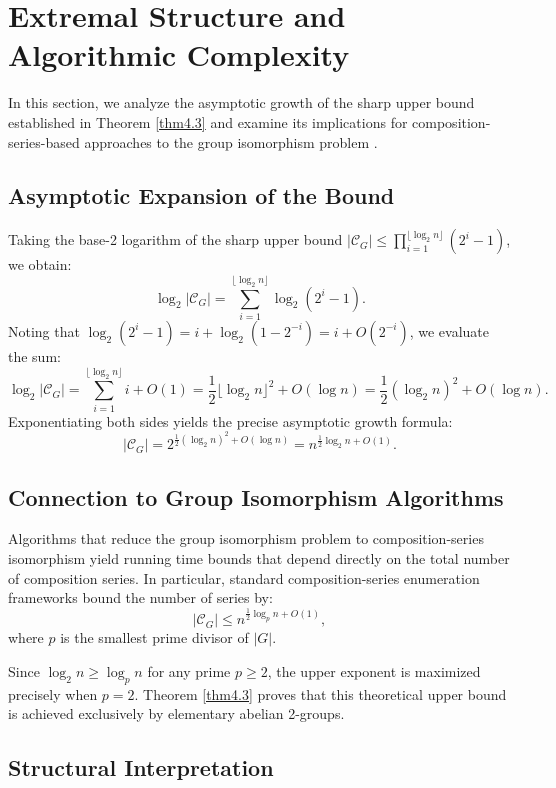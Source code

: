 \documentclass[11pt,a4paper]{article}
\theoremstyle{definition}
\begin{document}
\section{Extremal Structure and Algorithmic Complexity}

In this section, we analyze the asymptotic growth of the sharp upper bound established in Theorem \ref{thm4.3} and examine its implications for composition-series-based approaches to the group isomorphism problem \cite{rosenbaum}.

\subsection{Asymptotic Expansion of the Bound}

Taking the base-2 logarithm of the sharp upper bound $|\mathcal{C}_G| \le \prod_{i=1}^{\lfloor \log_2 n \rfloor} (2^i - 1)$, we obtain:
\[
\log_2 |\mathcal{C}_G| = \sum_{i=1}^{\lfloor \log_2 n \rfloor} \log_2(2^i - 1).
\]
Noting that $\log_2(2^i - 1) = i + \log_2(1 - 2^{-i}) = i + O(2^{-i})$, we evaluate the sum:
\[
\log_2 |\mathcal{C}_G| = \sum_{i=1}^{\lfloor \log_2 n \rfloor} i + O(1) = \frac{1}{2}\lfloor \log_2 n \rfloor^2 + O(\log n) = \frac{1}{2}(\log_2 n)^2 + O(\log n).
\]
Exponentiating both sides yields the precise asymptotic growth formula:
\[
|\mathcal{C}_G| = 2^{\frac{1}{2}(\log_2 n)^2 + O(\log n)} = n^{\frac{1}{2}\log_2 n + O(1)}.
\]

\subsection{Connection to Group Isomorphism Algorithms}

Algorithms that reduce the group isomorphism problem to composition-series isomorphism yield running time bounds that depend directly on the total number of composition series. In particular, standard composition-series enumeration frameworks bound the number of series by:
\[
|\mathcal{C}_G| \le n^{\frac{1}{2}\log_p n + O(1)},
\]
where $p$ is the smallest prime divisor of $|G|$.

Since $\log_2 n \ge \log_p n$ for any prime $p \ge 2$, the upper exponent is maximized precisely when $p = 2$. Theorem \ref{thm4.3} proves that this theoretical upper bound is achieved exclusively by elementary abelian 2-groups.

\subsection{Structural Interpretation}
\end{document}
